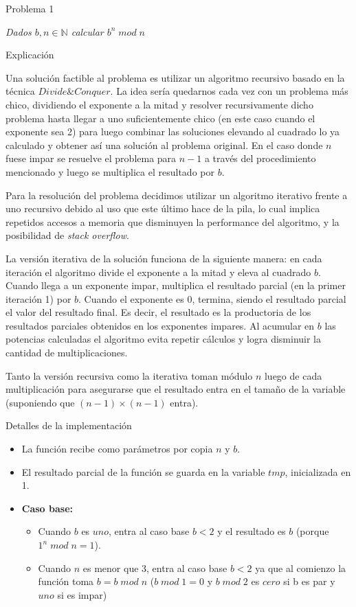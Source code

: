 \begin{section}{Problema 1}

	\textit{Dados $b,n \in \mathbb{N} $ calcular $b^n\; mod\; n$}

	\begin{subsection}{Explicación}

		Una solución factible al problema es utilizar un algoritmo recursivo basado en la técnica $Divide \& Conquer$. La idea sería quedarnos cada vez con un problema más chico, dividiendo el exponente a la mitad y resolver recursivamente dicho problema hasta llegar a uno suficientemente chico (en este caso cuando el exponente sea 2) para luego combinar las soluciones elevando al cuadrado lo ya calculado y obtener así una solución al problema original. En el caso donde $n$ fuese impar se resuelve el problema para $n-1$ a través del procedimiento mencionado y luego se multiplica el resultado por $b$.

		Para la resolución del problema decidimos utilizar un algoritmo iterativo frente a uno recursivo debido al uso que este último hace de la pila, lo cual implica repetidos accesos a memoria que disminuyen la performance del algoritmo, y la posibilidad de {\em stack overflow}.

		La versión iterativa de la solución funciona de la siguiente manera: en cada iteración el algoritmo divide el exponente a la mitad y eleva al cuadrado $b$. Cuando llega a un exponente impar, multiplica el resultado parcial (en la primer iteración 1) por $b$. Cuando el exponente es 0, termina, siendo el resultado parcial el valor del resultado final. Es decir, el resultado es la productoria de los resultados parciales obtenidos en los exponentes impares. Al acumular en $b$ las potencias calculadas el algoritmo evita repetir cálculos y logra disminuir la cantidad de multiplicaciones.

		Tanto la versión recursiva como la iterativa toman módulo $n$ luego de cada multiplicación para asegurarse que el resultado entra en el tamaño de la variable (suponiendo que $(n-1)\times (n-1)$ entra).
	\end{subsection}
	
	\begin{subsection}{Detalles de la implementación}

		\begin{itemize}
			\item La función recibe como parámetros por copia $n$ y $b$.
			\item El resultado parcial de la función se guarda en la variable $tmp$, inicializada en 1.
			\item \textbf{Caso base:} 
			\begin{itemize}
				\item Cuando $b$ es $uno$, entra al caso base $b<2$ y el resultado es $b$ (porque $1^n\;mod\;n=1$).
				\item Cuando $n$ es menor que 3, entra al caso base $b<2$ ya que al comienzo la función toma $b=b\;mod\; n$ ($b\; mod\; 1 = 0$ y $b\; mod\; 2$  es $cero$ si b es par y $uno$ si es impar) 
			\end{itemize}


\end{itemize}
\end{subsection}
\end{section}
